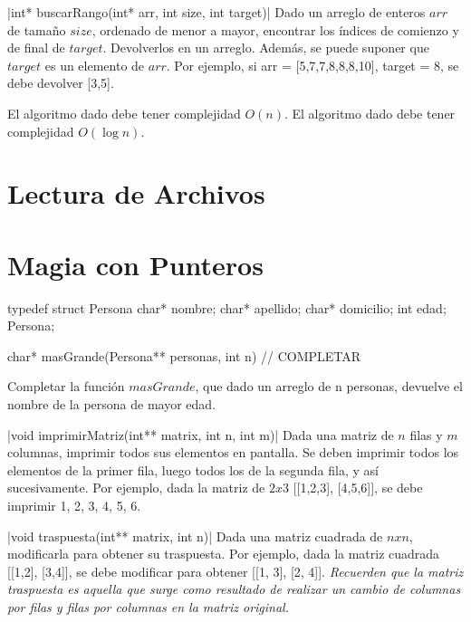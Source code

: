 \documentclass[titlepage,oneside]{book}
\begin{document}
\begin{Exercise}
    |int* buscarRango(int* arr, int size, int target)|
    Dado un arreglo de enteros $arr$ de tamaño $size$, ordenado de menor a mayor, encontrar los índices de comienzo y de final de $target$. Devolverlos en un arreglo. Además, se puede suponer que $target$ es un elemento de $arr$.
    \newline
    Por ejemplo, si arr = [5,7,7,8,8,8,10], target = 8, se debe devolver [3,5].

    \Question El algoritmo dado debe tener complejidad $O(n)$.
	\Question[difficulty=1] El algoritmo dado debe tener complejidad $O(\log n)$.
\end{Exercise}


\chapter{Lectura de Archivos}

\chapter{Magia con Punteros}

\begin{Exercise}

\begin{ccode}
typedef struct Persona {
    char* nombre;
    char* apellido;
    char* domicilio;
    int edad;
} Persona;

char* masGrande(Persona** personas, int n)
{
    // COMPLETAR
}
\end{ccode}

Completar la función $masGrande$, que dado un arreglo de n personas, devuelve el nombre de la persona de mayor edad.

\end{Exercise}

\begin{Exercise}
	|void imprimirMatriz(int** matrix, int n, int m)|
    Dada una matriz de $n$ filas y $m$ columnas, imprimir todos sus elementos en pantalla. Se deben imprimir todos los elementos de la primer fila, luego todos los de la segunda fila, y así sucesivamente. Por ejemplo, dada la matriz de $2x3$ [[1,2,3], [4,5,6]], se debe imprimir 1, 2, 3, 4, 5, 6.
\end{Exercise}

\begin{Exercise}
	|void traspuesta(int** matrix, int n)|
    Dada una matriz cuadrada de $nxn$, modificarla para obtener su traspuesta. Por ejemplo, dada la matriz cuadrada [[1,2], [3,4]], se debe modificar para obtener [[1, 3], [2, 4]]. \textit{Recuerden que la matriz traspuesta es aquella que surge como resultado de realizar un cambio de columnas por filas y filas por columnas en la matriz original.}

\end{Exercise}
\end{document}
